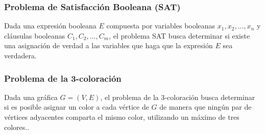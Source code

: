 \subsubsection*{\textcolor{Contraste3}{Problema de Satisfacción Booleana (SAT)}}

Dada una expresión booleana $E$ compuesta por variables booleanas $x_{1}, x_{2},. . .,x_{n}$
y cláusulas booleanas $C_{1}, C_{2},. . .,C_{m}$, el problema SAT busca determinar si existe 
una asignación de verdad a las variables que haga que la expresión $E$ sea verdadera.

\subsubsection*{\textcolor{Contraste3}{Problema de la 3-coloración}}

Dada una gráfica $G = (V,E)$, el problema de la 3-coloración busca determinar si es posible asignar 
un color a cada vértice de $G$ de manera que ningún par de vértices adyacentes comparta el mismo 
color, utilizando un máximo de tres colores..


